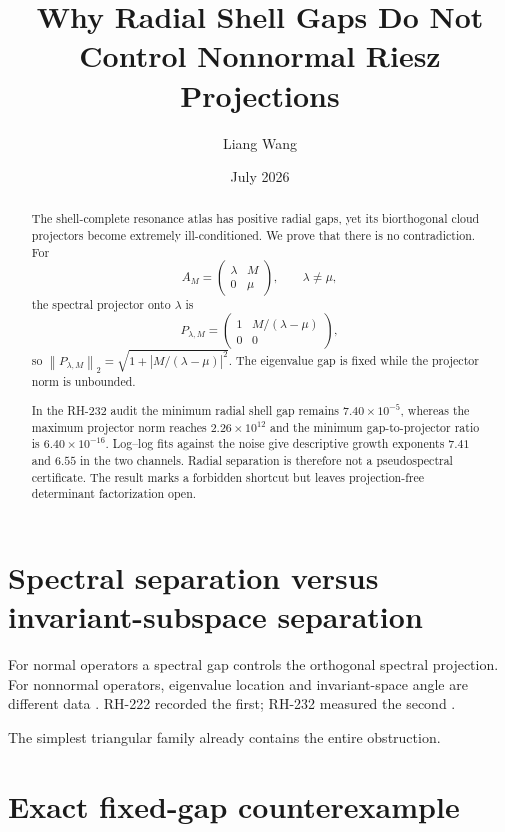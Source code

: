 \documentclass[11pt]{article}
\title{Why Radial Shell Gaps Do Not Control Nonnormal Riesz Projections}
\author{Liang Wang}
\date{July 2026}
\theoremstyle{remark}
\newcommand{\norm}[1]{\left\lVert#1\right\rVert}
\begin{document}
\maketitle

\begin{abstract}
The shell-complete resonance atlas has positive radial gaps, yet its
biorthogonal cloud projectors become extremely ill-conditioned.  We prove
that there is no contradiction.  For
\[
 A_M=\begin{pmatrix}\lambda&M\\0&\mu\end{pmatrix},\qquad \lambda\ne\mu,
\]
the spectral projector onto $\lambda$ is
\[
 P_{\lambda,M}=\begin{pmatrix}1&M/(\lambda-\mu)\\0&0\end{pmatrix},
\]
so $\norm{P_{\lambda,M}}_2=\sqrt{1+|M/(\lambda-\mu)|^2}$.  The eigenvalue gap
is fixed while the projector norm is unbounded.

In the RH-232 audit the minimum radial shell gap remains
$7.40\times10^{-5}$, whereas the maximum projector norm reaches
$2.26\times10^{12}$ and the minimum gap-to-projector ratio is
$6.40\times10^{-16}$.  Log--log fits against the noise give descriptive
growth exponents $7.41$ and $6.55$ in the two channels.  Radial separation is
therefore not a pseudospectral certificate.  The result marks a forbidden
shortcut but leaves projection-free determinant factorization open.
\end{abstract}

\section{Spectral separation versus invariant-subspace separation}

For normal operators a spectral gap controls the orthogonal spectral
projection.  For nonnormal operators, eigenvalue location and invariant-space
angle are different data \citep{Kato1995,TrefethenEmbree2005}.  RH-222
recorded the first; RH-232 measured the second
\citep{WangRH222,WangRH232}.

The simplest triangular family already contains the entire obstruction.

\section{Exact fixed-gap counterexample}
\end{document}
